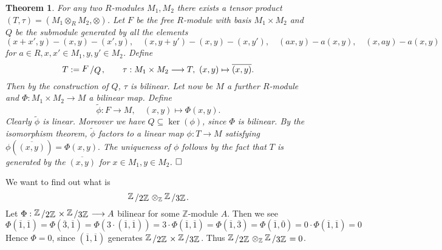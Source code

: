 \documentclass[11pt]{book}
\newtheorem{theorem}{Theorem}[section]
\theoremstyle{nonumberbreak}
\newenvironment{pr}[1][]{\ifthenelse{\equal{#1}{}}{\proof}{\proof[#1]}\rm}{\endproof}
\newenvironment{ex}[1][]{\ifthenelse{\equal{#1}{}}{\example}{\example[#1]}\rm}{\endexample}
\newcommand{\slant}[2]{{\raisebox{.1em}{$#1$}\left/\raisebox{-.1em}{$#2$}\right.}}
\begin{document}
\begin{spacing}{1.3}
\begin{theorem}%
For any two $R$-modules $M_1, M_2$ there exists a tensor product $(T, \tau)=(M_1 \otimes_R M_2, \otimes)$.
\begin{pr}
Let $F$ be the free $R$-module with basis $M_1 \times M_2$ and $Q$ be the submodule generated by all the elements
$$(x+x',y)-(x,y)-(x',y), \quad (x,y+y')-(x,y)-(x,y'), \quad (ax,y)-a(x,y), \quad (x,ay)-a(x,y)$$
for $a \in R, x,x' \in M_1, y,y' \in M_2$. 
Define $$T:= \slant{F}{Q}, \qquad \tau: M_1 \times M_2 \longrightarrow T, \ (x,y) \mapsto \overline{(x,y)}.$$
Then by the construction of $Q$, $\tau$ is bilinear.
Let now be $M$ a further $R$-module and $\Phi: M_1 \times M_2 \longrightarrow M$ a bilinear map.
Define $$\tilde{\phi}: F \longrightarrow M, \quad (x,y) \mapsto \Phi(x,y).$$
Clearly $\tilde{\phi}$ is linear. Moreover we have $Q \subseteq \ker(\phi)$, since $\Phi$ is bilinear.
By the isomorphism theorem, $\tilde{\phi}$ factors to a linear map
$\phi: T \longrightarrow M$ satisfying $\phi\left(\overline{(x,y)}\right)= \Phi(x,y).$
The uniqueness of $\phi$ follows by the fact that $T$ is generated by the $\overline{(x,y)}$ for $x \in M_1, y \in M_2$. $\hfill \Box$
\end{pr}
\end{theorem}



\begin{ex}
We want to find out what is
$$\slant{\mathbb{Z}}{2 \mathbb{Z}} \otimes_{\mathbb{Z}} \slant{\mathbb{Z}}{3 \mathbb{Z}}.$$
Let $\Phi: \slant{\mathbb{Z}}{2 \mathbb{Z}} \times \slant{\mathbb{Z}}{3 \mathbb{Z}} \longrightarrow A$ bilinear for some $\mathbb{Z}$-module $A$. Then we see
$$\Phi(\overline{1}, \overline{1})=\Phi(\overline{3}, \overline{1})=\Phi\left(3 \cdot (\overline{1}, \overline{1})\right)= 3 \cdot \Phi(\overline{1}, \overline{1})=\Phi(\overline{1}, \overline{3})=\Phi(\overline{1},\overline{0})=0\cdot \Phi(\overline{1}, \overline{1}) =0$$
Hence $\Phi=0$, since $(\overline{1}, \overline{1})$ generates $\slant{\mathbb{Z}}{2 \mathbb{Z}} \times \slant{\mathbb{Z}}{3 \mathbb{Z}}$. Thus $\slant{\mathbb{Z}}{2 \mathbb{Z}} \otimes_{\mathbb{Z}} \slant{\mathbb{Z}}{3 \mathbb{Z}}=0$.
\end{ex}


\end{spacing}
\end{document}
